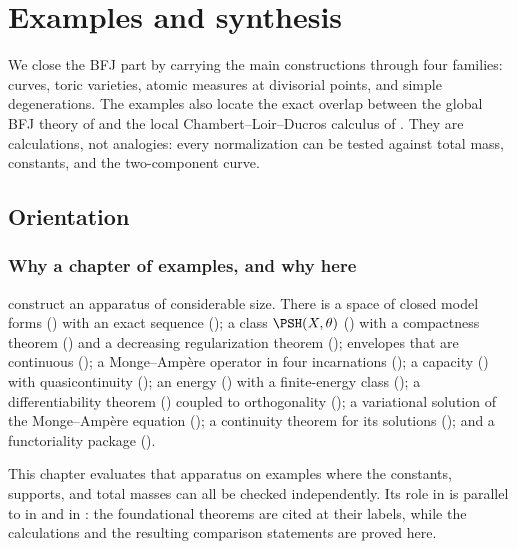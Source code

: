 \chapter{Examples and synthesis}
\label{chap:bfj-examples}

We close the BFJ part by carrying the main constructions through four
families: curves, toric varieties, atomic measures at divisorial points, and
simple degenerations.  The examples also locate the exact overlap between the
global BFJ theory of  and the local Chambert--Loir--Ducros
calculus of .  They are calculations, not analogies: every
normalization can be tested against total mass, constants, and the
two-component curve.

\section{Orientation}
\label{sec:ch31-orientation}

\subsection{Why a chapter of examples, and why here}
\label{sec:ch31-why}

 construct an
apparatus of considerable size.  There is a space of closed model forms
() with an exact sequence
(); a class $\PSH(X,\theta)$
() with a compactness theorem
() and a decreasing regularization theorem
(); envelopes that are continuous
(); a Monge--Amp\`ere operator in four
incarnations (); a capacity
() with quasicontinuity
(); an energy
() with a finite-energy class
(); a differentiability theorem
() coupled to orthogonality
(); a variational solution of the
Monge--Amp\`ere equation (); a continuity theorem
for its solutions (); and a
functoriality package ().

This chapter evaluates that apparatus on examples where the constants,
supports, and total masses can all be checked independently.  Its role in
 is parallel to  in
 and  in :
the foundational theorems are cited at their labels, while the calculations
and the resulting comparison statements are proved here.

